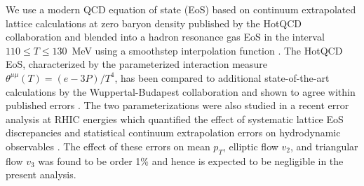 \documentclass[aps,prc,reprint,amsmath,nofootinbib,superscriptaddress]{revtex4-1}
\begin{document}
We use a modern QCD equation of state (EoS) based on continuum extrapolated lattice calculations at zero baryon density published by the HotQCD collaboration \cite{Bazavov:2014pvz} and blended into a hadron resonance gas EoS in the interval $110 \le T \le 130$~MeV using a smoothstep interpolation function \cite{Moreland:2015dvc}.
The HotQCD EoS, characterized by the parameterized interaction measure $\theta^{\mu\mu}(T) = (e - 3P)/T^4$, has been compared to additional state-of-the-art calculations by the Wuppertal-Budapest collaboration and shown to agree within published errors \cite{Bazavov:2014pvz}.
The two parameterizations were also studied in a recent error analysis at RHIC energies which quantified the effect of systematic lattice EoS discrepancies and statistical continuum extrapolation errors on hydrodynamic observables \cite{Moreland:2015dvc}.
The effect of these errors on mean $p_T$, elliptic flow $v_2$, and triangular flow $v_3$ was found to be order 1\% and hence is expected to be negligible in the present analysis.
\end{document}
